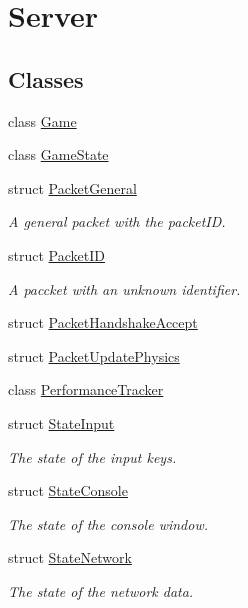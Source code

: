 \hypertarget{group__server}{\section{Server}
\label{group__server}
}
\subsection*{Classes}
\begin{DoxyCompactItemize}
\item 
class \hyperlink{class_game}{Game}
\item 
class \hyperlink{class_game_state}{Game\-State}
\item 
struct \hyperlink{struct_packet_general}{Packet\-General}
\begin{DoxyCompactList}\small\item\em A general packet with the packet\-I\-D. \end{DoxyCompactList}\item 
struct \hyperlink{struct_packet_i_d}{Packet\-I\-D}
\begin{DoxyCompactList}\small\item\em A paccket with an unknown identifier. \end{DoxyCompactList}\item 
struct \hyperlink{struct_packet_handshake_accept}{Packet\-Handshake\-Accept}
\item 
struct \hyperlink{struct_packet_update_physics}{Packet\-Update\-Physics}
\item 
class \hyperlink{class_performance_tracker}{Performance\-Tracker}
\item 
struct \hyperlink{struct_state_input}{State\-Input}
\begin{DoxyCompactList}\small\item\em The state of the input keys. \end{DoxyCompactList}\item 
struct \hyperlink{struct_state_console}{State\-Console}
\begin{DoxyCompactList}\small\item\em The state of the console window. \end{DoxyCompactList}\item 
struct \hyperlink{struct_state_network}{State\-Network}
\begin{DoxyCompactList}\small\item\em The state of the network data. \end{DoxyCompactList}\item 

\end{DoxyCompactItemize}
